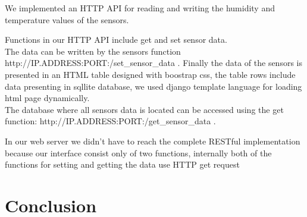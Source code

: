 \documentclass[11pt,paper=a4,parskip=half]{scrartcl}
\begin{document}
We implemented an HTTP API for reading and writing the humidity and temperature values of the sensors.
 
Functions in our HTTP API include get and set sensor data.\\The data can be written by the sensors function http://IP.ADDRESS:PORT:/set\_sensor\_data .
Finally the data of the sensors is presented in an HTML table designed with boostrap css, the table rows include data presenting in sqllite database, we used django template language for loading html page dynamically.\\The database where all sensors data is located can be accessed using the get function:
http://IP.ADDRESS:PORT:/get\_sensor\_data .

In our web server we didn't have to reach the complete RESTful implementation because our interface consist only of two functions, internally both of the functions for setting and getting the data use HTTP get request

\section{Conclusion}





\newpage
\nocite{*}


\end{document}
